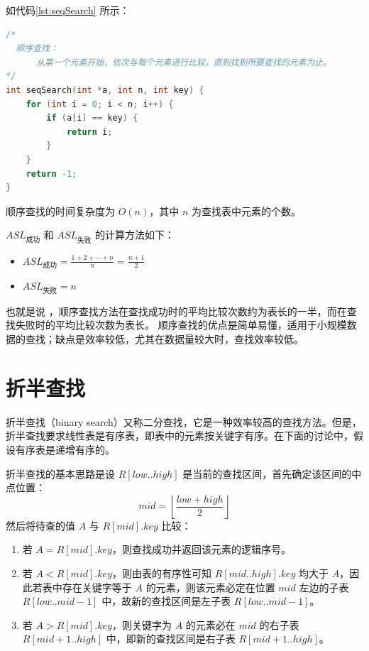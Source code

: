 \documentclass[lang=cn,newtx,10pt,scheme=chinese]{../elegantbook}
\begin{document}
如代码\ref{lst:seqSearch} 所示：

\begin{lstlisting}[language=C++, caption={顺序查找算法} label={lst:seqSearch}]
  /*
  顺序查找：
      从第一个元素开始，依次与每个元素进行比较，直到找到所要查找的元素为止。
*/
int seqSearch(int *a, int n, int key) {
    for (int i = 0; i < n; i++) {
        if (a[i] == key) {
            return i;
        }
    }
    return -1;
}

\end{lstlisting}

顺序查找的时间复杂度为 $O(n)$，其中 $n$ 为查找表中元素的个数。

$ASL_{\text{成功}}$ 和 $ASL_{\text{失败}}$ 的计算方法如下：

\begin{itemize}
  \item $ASL_{\text{成功}} = \frac{1 + 2 + \cdots + n}{n} = \frac{n + 1}{2}$
  \item $ASL_{\text{失败}} = n$
  \end{itemize}

也就是说 ，顺序查找方法在查找成功时的平均比较次数约为表长的一半，而在查找失败时的平均比较次数为表长。
顺序查找的优点是简单易懂，适用于小规模数据的查找；缺点是效率较低，尤其在数据量较大时，查找效率较低。

\section{折半查找}
折半查找（binary search）又称二分查找，它是一种效率较高的查找方法。但是，折半查找要求线性表是有序表，即表中的元素按关键字有序。在下面的讨论中，假设有序表是递增有序的。

折半查找的基本思路是设 $R[low..high]$ 是当前的查找区间，首先确定该区间的中点位置：
\[
mid = \left\lfloor \frac{low + high}{2} \right\rfloor
\]
然后将待查的值 $A$ 与 $R[mid].key$ 比较：

\begin{enumerate}
  \item 若 $A = R[mid].key$，则查找成功并返回该元素的逻辑序号。
  \item 若 $A < R[mid].key$，则由表的有序性可知 $R[mid..high].key$ 均大于 $A$，因此若表中存在关键字等于 $A$ 的元素，则该元素必定在位置 $mid$ 左边的子表 $R[low..mid-1]$ 中，故新的查找区间是左子表 $R[low..mid-1]$。
  \item 若 $A > R[mid].key$，则关键字为 $A$ 的元素必在 $mid$ 的右子表 $R[mid+1..high]$ 中，即新的查找区间是右子表 $R[mid+1..high]$。
\end{enumerate}
\end{document}
